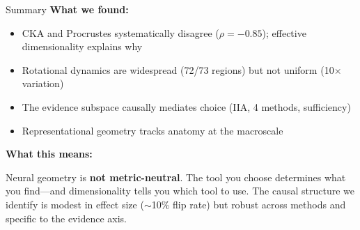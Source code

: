 \documentclass[aspectratio=169,11pt]{beamer}
\begin{document}
\begin{frame}{Summary}
\textbf{What we found:}
\begin{itemize}
  \item CKA and Procrustes systematically disagree ($\rho = -0.85$); effective dimensionality explains why
  \item Rotational dynamics are widespread (72/73 regions) but not uniform (10$\times$ variation)
  \item The evidence subspace causally mediates choice (IIA, 4 methods, sufficiency)
  \item Representational geometry tracks anatomy at the macroscale
\end{itemize}

\vspace{0.8em}
\textbf{What this means:}

\vspace{0.3em}
Neural geometry is \textbf{not metric-neutral}. The tool you choose determines what you find---and dimensionality tells you which tool to use. The causal structure we identify is modest in effect size ($\sim$10\% flip rate) but robust across methods and specific to the evidence axis.
\end{frame}

\end{document}
